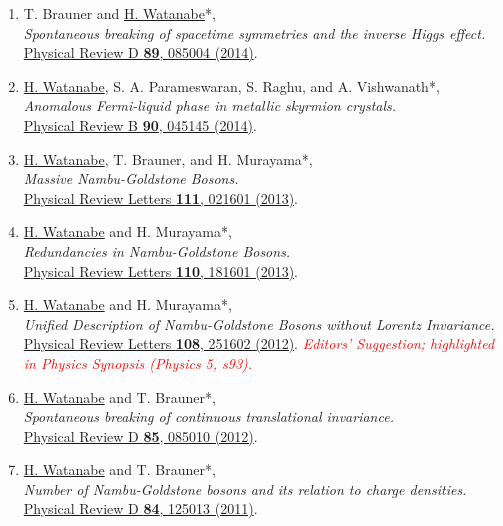 \documentclass[letterpaper,11pt]{article}
\begin{document}
\begin{enumerate}
\item T. Brauner and \underline{H. Watanabe}*, \\\emph{Spontaneous breaking of spacetime symmetries and the inverse Higgs effect.}\\{\href{https://doi.org/10.1103/PhysRevD.89.085004}{Physical Review D {\bf 89}, 085004 (2014)}.}

\item \underline{H. Watanabe}, S. A. Parameswaran, S. Raghu, and A. Vishwanath*, \\\emph{Anomalous Fermi-liquid phase in metallic skyrmion crystals.}\\{\href{https://doi.org/10.1103/PhysRevB.90.045145}{Physical Review B {\bf 90}, 045145 (2014)}.}

\item \underline{H. Watanabe}, T. Brauner, and H. Murayama*, \\\emph{Massive Nambu-Goldstone Bosons.}\\{\href{https://doi.org/10.1103/PhysRevLett.111.021601}{Physical Review Letters {\bf 111}, 021601 (2013)}.}

\item \underline{H. Watanabe} and H. Murayama*, \\\emph{Redundancies in Nambu-Goldstone Bosons.}\\{\href{https://doi.org/10.1103/PhysRevLett.110.181601}{Physical Review Letters {\bf 110}, 181601 (2013)}.}

\item \underline{H. Watanabe} and H. Murayama*, \\\emph{Unified Description of Nambu-Goldstone Bosons without Lorentz Invariance.}\\{\href{https://doi.org/10.1103/PhysRevLett.108.251602}{Physical Review Letters {\bf 108}, 251602 (2012)}.} \emph{\small \textcolor{red}{Editors' Suggestion; highlighted in Physics Synopsis (Physics 5, s93).}}


\item \underline{H. Watanabe} and T. Brauner*, \\\emph{Spontaneous breaking of continuous translational invariance.}\\{\href{https://doi.org/10.1103/PhysRevD.85.085010}{Physical Review D {\bf 85}, 085010 (2012)}.}

\item \underline{H. Watanabe} and T. Brauner*, \\\emph{Number of Nambu-Goldstone bosons and its relation to charge densities.}\\{\href{https://doi.org/10.1103/PhysRevD.84.125013}{Physical Review D {\bf 84}, 125013 (2011)}.}


\end{enumerate}
\end{document}
